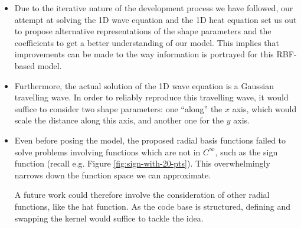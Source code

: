 \documentclass[12pt]{report} %
\begin{document}
\begin{itemize}
  \item Due to the iterative nature of the development process we have followed, our attempt at solving the 1D wave equation and the 1D heat equation set us out to propose alternative representations of the shape parameters and the coefficients to get a better understanding of our model. This implies that improvements can be made to the way information is portrayed for this RBF-based model.
  
  \item Furthermore, the actual solution of the 1D wave equation is a Gaussian travelling wave. In order to reliably reproduce this travelling wave, it would suffice to consider two shape parameters: one ``along'' the $x$ axis, which would scale the distance along this axis, and another one for the $y$ axis. 
  
  \item Even before posing the model, the proposed radial basis functions failed to solve problems involving functions which are not in $C^\infty$, such as the sign function (recall e.g. Figure \ref{fig:sign-with-20-pts}). This overwhelmingly narrows down the function space we can approximate. 
  
  A future work could therefore involve the consideration of other radial functions, like the hat function. As the code base is structured, defining and swapping the kernel would suffice to tackle the idea.
\end{itemize}


\clearpage


\printbibliography




\end{document}

